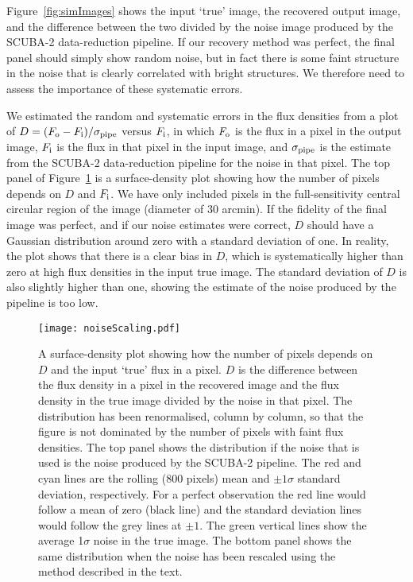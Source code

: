 \documentclass[a4paper,fleqn,usenatbib, twocolumn]{aastex63}
\begin{document}
Figure~\ref{fig:simImages} shows the input `true' image, the recovered output
image, and the difference between the two divided by the noise image
produced by the SCUBA-2 data-reduction pipeline. If our recovery method
was perfect, the final panel should simply show random noise, but in fact there
is some faint structure in the noise that is clearly correlated with bright structures. We therefore need to assess the importance of these systematic
errors.

We estimated the random and systematic errors in the flux densities
from a plot of $D = (F_{\rm o} - F_{\rm i})/\sigma_{\rm pipe}$ versus $F_{\rm i}$, in which
$F_{\rm o}$ is the flux in a pixel in the output image, $F_{\rm i}$ is the flux in
that pixel in the input image, and $\sigma_{\rm pipe}$ is the estimate
from the SCUBA-2 data-reduction pipeline for the noise in that pixel.
The top panel of Figure~\ref{fig:noiseScaling} is a surface-density plot showing how
the number of pixels depends on $D$ and $F_{\rm i}$. We have only included pixels
in the full-sensitivity 
central circular region of the 
image (diameter of 30 arcmin). 
If the fidelity of the final image was perfect, and if our noise estimates were
correct, $D$ should have a Gaussian distribution
around zero with a standard deviation of one. In reality, the plot shows that there is a clear bias in $D$, which is systematically higher than zero at high flux
densities in the input true image. The standard deviation of $D$ is also slightly higher than one, showing the estimate of the noise produced
by the pipeline is too low.


\begin{figure}
  \centering
  \texttt{[image: noiseScaling.pdf]}
  \caption{A surface-density plot showing how the number of pixels depends on
  $D$ and the input `true' flux in a pixel. $D$ is the difference between the
  flux density in a pixel in the recovered image and the  flux density in the true image divided by the noise in that pixel. The distribution has been renormalised, column by column, so that the figure is not dominated by the number of pixels
  with faint flux densities. The top panel shows the distribution if the noise that is used is the noise produced by the SCUBA-2 pipeline. 
  The red and cyan lines are the rolling (800 pixels) mean and $\pm1\sigma$ 
  standard deviation, respectively. For a perfect observation
  the red line would follow a mean of zero (black line) and the standard deviation lines would follow the grey lines at $\pm 1$. The green vertical lines show the average 1$\sigma$ 
  noise in the true image. The bottom panel shows the same distribution when the noise has been rescaled using the method described in the text.} 
  \label{fig:noiseScaling}
\end{figure}
\end{document}
